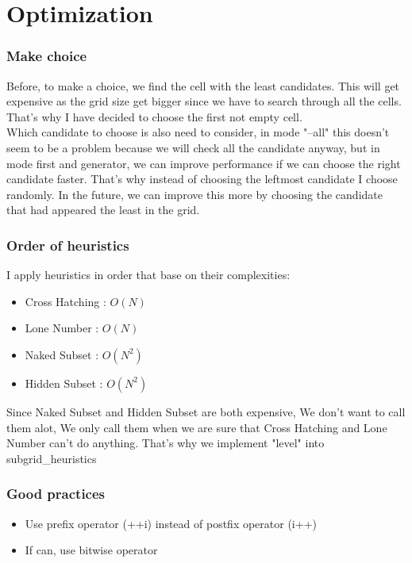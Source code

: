 \documentclass{article}
\begin{document}
\section{Optimization}
\subsubsection{Make choice}
Before, to make a choice, we find the cell with the least candidates. This will get expensive as the grid size get bigger since we have to search through all the cells. That's why I have decided to choose the first not empty cell.
\\
Which candidate to choose is also need to consider, in mode "--all" this doesn't seem to be a problem because we will check all the candidate anyway, but in mode first and generator, we can improve performance if we can choose the right candidate faster. That's why instead of choosing the leftmost candidate I choose randomly. In the future, we can improve this more by choosing the candidate that had appeared the least in the grid.
\subsubsection{Order of heuristics}
I apply heuristics in order that base on their complexities: 
\begin{itemize}
    \item Cross Hatching : $O(N)$
    \item Lone Number : $O(N)$
    \item Naked Subset : $O(N^{2})$
    \item Hidden Subset : $O(N^{2})$
\end{itemize}
Since Naked Subset and Hidden Subset are both expensive, We don't want to call them alot, We only call them when we are sure that Cross Hatching and Lone Number can't do anything. That's why we implement "level" into subgrid\_heuristics
\subsubsection{Good practices}
\begin{itemize}
    \item Use prefix operator (++i) instead of postfix operator (i++)
    \item If can, use bitwise operator
\end{itemize}
\end{document}
